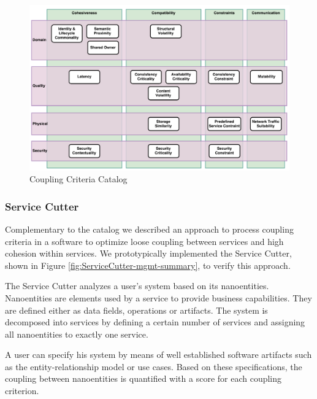 \begin{figure}[H]
	\centerline{\includegraphics[scale=0.5]{diagrams/CouplingCatalog.pdf}}
	\caption{Coupling Criteria Catalog}
	\label{fig:cc-catalog-mgmt-summary}
\end{figure}


\subsubsection{Service Cutter}

Complementary to the catalog we described an approach to process coupling criteria in a software to optimize loose coupling between services and high cohesion within services. We prototypically implemented the Service Cutter, shown in Figure \ref{fig:ServiceCutter-mgmt-summary}, to verify this approach.

The Service Cutter analyzes a user's \gls{system} based on its nanoentities. Nanoentities are elements used by a service to provide business capabilities. They are defined either as data fields, operations or artifacts. The system is decomposed into services by defining a certain number of services and assigning all nanoentities to exactly one service.

A user can specify his system by means of well established software artifacts such as the entity-relationship model or use cases. Based on these specifications, the coupling between nanoentities is quantified with a score for each coupling criterion. 

